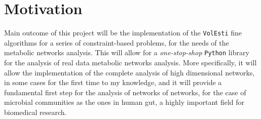 \documentclass[a4paper, 12pt]{article}
\def\volesti{{\tt volesti}}
\begin{document}





\section{Motivation}\label{sec:motivation}
Main outcome of this project will be the implementation of the \texttt{VolEsti} fine algorithms for a series of constraint-based problems, for the needs of the metabolic networks analysis. This will allow for a \textit{one-stop-shop} \texttt{Python} library for the analysis of real data metabolic networks analysis. More specifically, it will allow the implementation of the complete analysis of high dimensional networks, in some cases for the first time to my knowledge, and it will provide a fundamental first step for the analysis of networks of networks, for the case of microbial communities as the ones in human gut, a highly important field for biomedical research.
\end{document}
